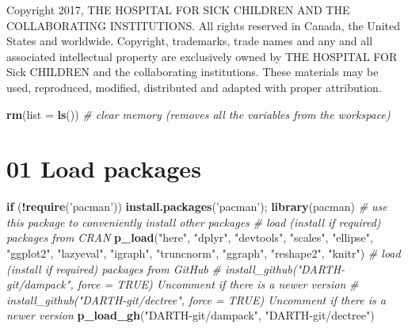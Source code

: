 \documentclass[
]{article}
\newenvironment{Shaded}{\begin{snugshade}}{\end{snugshade}}
\newcommand{\CommentTok}[1]{\textcolor[rgb]{0.56,0.35,0.01}{\textit{#1}}}
\newcommand{\ControlFlowTok}[1]{\textcolor[rgb]{0.13,0.29,0.53}{\textbf{#1}}}
\newcommand{\DataTypeTok}[1]{\textcolor[rgb]{0.13,0.29,0.53}{#1}}
\newcommand{\KeywordTok}[1]{\textcolor[rgb]{0.13,0.29,0.53}{\textbf{#1}}}
\newcommand{\NormalTok}[1]{#1}
\newcommand{\OperatorTok}[1]{\textcolor[rgb]{0.81,0.36,0.00}{\textbf{#1}}}
\newcommand{\StringTok}[1]{\textcolor[rgb]{0.31,0.60,0.02}{#1}}
\begin{document}
Copyright 2017, THE HOSPITAL FOR SICK CHILDREN AND THE COLLABORATING
INSTITUTIONS. All rights reserved in Canada, the United States and
worldwide. Copyright, trademarks, trade names and any and all associated
intellectual property are exclusively owned by THE HOSPITAL FOR Sick
CHILDREN and the collaborating institutions. These materials may be
used, reproduced, modified, distributed and adapted with proper
attribution.

\newpage

\begin{Shaded}
\begin{Highlighting}[]
\KeywordTok{rm}\NormalTok{(}\DataTypeTok{list =} \KeywordTok{ls}\NormalTok{())      }\CommentTok{# clear memory (removes all the variables from the workspace)}
\end{Highlighting}
\end{Shaded}

\hypertarget{load-packages}{%
\section{01 Load packages}\label{load-packages}}

\begin{Shaded}
\begin{Highlighting}[]
\ControlFlowTok{if}\NormalTok{ (}\OperatorTok{!}\KeywordTok{require}\NormalTok{(}\StringTok{'pacman'}\NormalTok{)) }\KeywordTok{install.packages}\NormalTok{(}\StringTok{'pacman'}\NormalTok{); }\KeywordTok{library}\NormalTok{(pacman) }\CommentTok{# use this package to conveniently install other packages}
\CommentTok{# load (install if required) packages from CRAN}
\KeywordTok{p_load}\NormalTok{(}\StringTok{"here"}\NormalTok{, }\StringTok{"dplyr"}\NormalTok{, }\StringTok{"devtools"}\NormalTok{, }\StringTok{"scales"}\NormalTok{, }\StringTok{"ellipse"}\NormalTok{, }\StringTok{"ggplot2"}\NormalTok{, }\StringTok{"lazyeval"}\NormalTok{, }\StringTok{"igraph"}\NormalTok{, }\StringTok{"truncnorm"}\NormalTok{, }\StringTok{"ggraph"}\NormalTok{, }\StringTok{"reshape2"}\NormalTok{, }\StringTok{"knitr"}\NormalTok{)                                               }
\CommentTok{# load (install if required) packages from GitHub}
\CommentTok{# install_github("DARTH-git/dampack", force = TRUE) Uncomment if there is a newer version}
\CommentTok{# install_github("DARTH-git/dectree", force = TRUE) Uncomment if there is a newer version}
\KeywordTok{p_load_gh}\NormalTok{(}\StringTok{"DARTH-git/dampack"}\NormalTok{, }\StringTok{"DARTH-git/dectree"}\NormalTok{)}
\end{Highlighting}
\end{Shaded}
\end{document}
